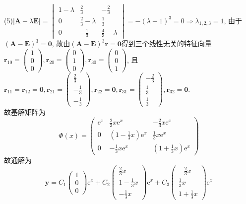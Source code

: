 \documentclass[titlepage,11pt,a4paper,twoside]{report}
\makeatletter
\newcommand\e{\mathrm{e}}
\newcommand\bmitPhi{\bm{\varPhi}}
\newenvironment{solve}{\par
	\pushQED{\qed}%
	\normalfont \topsep1\p@\@plus6\p@\relax
	\trivlist
	\item\relax
	{\hspace*{\parindent}{\heiti 解}\@addpunct{:}}\hspace\labelsep\ignorespaces
}{%
	\popQED\endtrivlist\@endpefalse
}
\makeatother
\begin{document}
\begin{solve}
(5)$|\bm{A}-\lambda\bm{E}|=\begin{vmatrix}1-\lambda&\frac{2}{3}&-\frac{2}{3}\\0&\frac{2}{3}-\lambda&\frac{1}{3}\\0&-\frac{1}{3}&\frac{4}{3}-\lambda\end{vmatrix}=-(\lambda-1)^3=0\Rightarrow\lambda_{1,2,3}=1$, 由于$(\bm{A}-\bm{E})^3=\bm{0}$, 故由$(\bm{A}-\bm{E})^3\bm{r}=\bm{0}$得到三个线性无关的特征向量$\bm{r}_{10}=\begin{pmatrix}1\\0\\0\end{pmatrix},\bm{r}_{20}=\begin{pmatrix}0\\1\\0\end{pmatrix},\bm{r}_{30}=\begin{pmatrix}0\\0\\1\end{pmatrix}$, 且$\bm{r}_{11}=\bm{r}_{12}=\bm{0},\bm{r}_{21}=\begin{pmatrix}\frac{2}{3}\\-\frac{1}{3}\\-\frac{1}{3}\end{pmatrix},\bm{r}_{22}=\bm{0},\bm{r}_{31}=\begin{pmatrix}-\frac{2}{3}\\\frac{1}{3}\\\frac{1}{3}\end{pmatrix},\bm{r}_{32}=\bm{0}$.\\
故基解矩阵为
\[\bmitPhi(x)=\begin{pmatrix}\e^x&\frac{2}{3}x\e^x&-\frac{2}{3}x\e^x\\
0&\left(1-\frac{1}{3}x\right)\e^x&\frac{1}{3}x\e^x\\
0&-\frac{1}{3}x\e^x&\left(1+\frac{1}{3}x\right)\e^x\end{pmatrix}\]
故通解为
\[\bm{y}=C_1\begin{pmatrix}1\\0\\0\end{pmatrix}\e^x+C_2\begin{pmatrix}\frac{2}{3}x\\1-\frac{1}{3}x\\-\frac{1}{3}x\end{pmatrix}\e^x+C_3\begin{pmatrix}-\frac{2}{3}x\\\frac{1}{3}x\\1+\frac{1}{3}x\end{pmatrix}\e^x\]

\end{solve}
\end{document}
